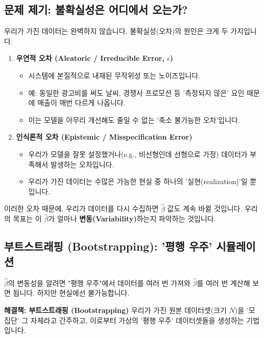 \documentclass[11pt,a4paper]{book}
\theoremstyle{definition}
\begin{document}
\subsection{문제 제기: 불확실성은 어디에서 오는가?}

우리가 가진 데이터는 완벽하지 않습니다. 불확실성(오차)의 원인은 크게 두 가지입니다.

\begin{enumerate}
    \item \textbf{우연적 오차 (Aleatoric / Irreducible Error, $\epsilon$)}
        \begin{itemize}
            \item 시스템에 본질적으로 내재된 무작위성 또는 노이즈입니다.
            \item 예: 동일한 광고비를 써도 날씨, 경쟁사 프로모션 등 '측정되지 않은' 요인 때문에 매출이 매번 다르게 나옵니다.
            \item 이는 모델을 아무리 개선해도 줄일 수 없는 '축소 불가능한 오차'입니다.
        \end{itemize}
    \item \textbf{인식론적 오차 (Epistemic / Misspecification Error)}
        \begin{itemize}
            \item 우리가 모델을 잘못 설정했거나(e.g., 비선형인데 선형으로 가정) 데이터가 부족해서 발생하는 오차입니다.
            \item 우리가 가진 데이터는 수많은 가능한 현실 중 하나의 '실현(realization)'일 뿐입니다.
        \end{itemize}
\end{enumerate}

이러한 오차 때문에, 우리가 데이터를 다시 수집하면 $\hat{\beta}$ 값도 계속 바뀔 것입니다. 우리의 목표는 이 $\hat{\beta}$가 얼마나 \textbf{변동(Variability)}하는지 파악하는 것입니다.

\subsection{부트스트래핑 (Bootstrapping): '평행 우주' 시뮬레이션}

$\hat{\beta}$의 변동성을 알려면 "평행 우주"에서 데이터를 여러 번 가져와 $\hat{\beta}$를 여러 번 계산해 보면 됩니다. 하지만 현실에선 불가능합니다.

\textbf{해결책: 부트스트래핑 (Bootstrapping)}
우리가 가진 원본 데이터셋(크기 $N$)을 '모집단' 그 자체라고 간주하고, 이로부터 가상의 '평행 우주' 데이터셋들을 생성하는 기법입니다.
\end{document}
